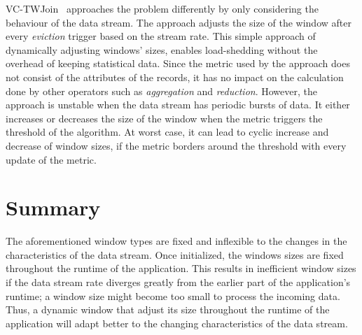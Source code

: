 VC-TWJoin~\cite{vctw_join} approaches the problem differently by only considering 
the behaviour of the data stream. The approach adjusts the size of the window 
after every \emph{eviction} trigger based on the stream rate. This simple approach 
of dynamically adjusting windows' sizes, enables load-shedding without the overhead of 
keeping statistical data. Since the metric used by the approach does not consist 
of the attributes of the records, it has no impact on the calculation 
done by other operators such as \emph{aggregation} and \emph{reduction}.
However, the approach is unstable when the data stream has periodic bursts of data.
It either increases or decreases the size of the window when the metric triggers 
the threshold of the algorithm. At worst case, it can lead to cyclic increase and 
decrease of window sizes, if the metric borders around the threshold with every 
update of the metric.


\section{Summary}%
\label{sec:Summary}

The aforementioned window types are fixed and inflexible to the changes 
in the characteristics of the data stream. Once initialized, the windows sizes 
are fixed throughout the runtime of the application. This results in inefficient 
window sizes if the data stream rate diverges greatly from the earlier part of the 
application's runtime; a window size might become too small to process the incoming 
data. Thus, a dynamic window that adjust its size throughout the runtime of the application 
will adapt better to the changing characteristics of the data stream. 


